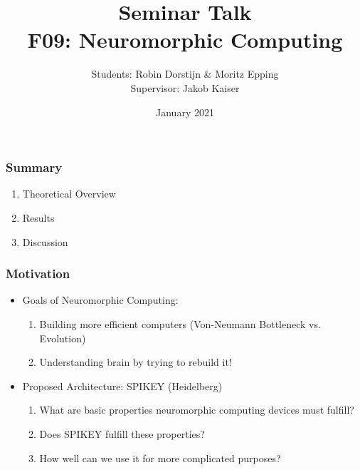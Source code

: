 \documentclass{beamer}
\title{Seminar Talk \\ F09: Neuromorphic Computing}
\author{Students: Robin Dorstijn \& Moritz Epping \\ Supervisor: Jakob Kaiser}
\institute{Universität Heidelberg}
\date{January 2021}
\begin{document}
\frame{\titlepage}

\begin{frame}
    \frametitle{Summary}
    \begin{enumerate}
        \item Theoretical Overview
        \item Results
        \item Discussion
    \end{enumerate}
\end{frame}

\begin{frame}
    \frametitle{Motivation}
   	\begin{itemize}
   		\item Goals of Neuromorphic Computing:
   		\begin{enumerate}
   			\item Building more efficient computers (Von-Neumann Bottleneck vs.  Evolution)
   			\item  Understanding brain by trying to rebuild it!	
   		\end{enumerate}
   		\bigskip
   		\item Proposed Architecture: SPIKEY (Heidelberg)
   		\begin{enumerate}
   			\item What are basic properties neuromorphic computing devices must fulfill?
   			\item Does SPIKEY fulfill these properties?
   			\item How well can we use it for more complicated purposes?
   		\end{enumerate}
   	\end{itemize}
\end{frame}
\end{document}
